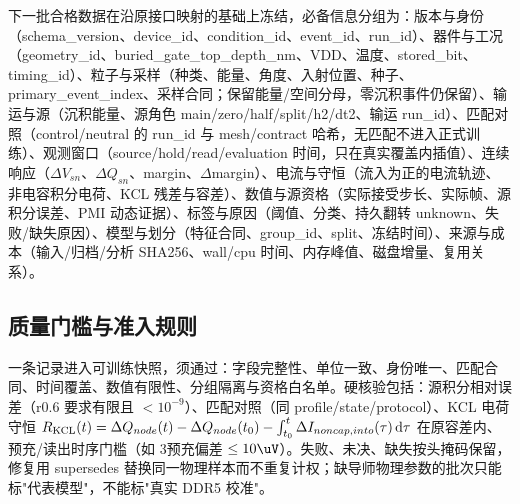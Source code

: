下一批合格数据在沿原接口映射的基础上冻结，必备信息分组为：版本与身份（schema\_version、device\_id、condition\_id、event\_id、run\_id）、器件与工况（geometry\_id、buried\_gate\_top\_depth\_nm、VDD、温度、stored\_bit、timing\_id）、粒子与采样（种类、能量、角度、入射位置、种子、primary\_event\_index、采样合同；保留能量/空间分母，零沉积事件仍保留）、输运与源（沉积能量、源角色 main/zero/half/split/h2/dt2、输运 run\_id）、匹配对照（control/neutral 的 run\_id 与 mesh/contract 哈希，无匹配不进入正式训练）、观测窗口（source/hold/read/evaluation 时间，只在真实覆盖内插值）、连续响应（$\Delta V_{sn}$、$\Delta Q_{sn}$、margin、$\Delta$margin）、电流与守恒（流入为正的电流轨迹、非电容积分电荷、KCL 残差与容差）、数值与源资格（实际接受步长、实际帧、源积分误差、PMI 动态证据）、标签与原因（阈值、分类、持久翻转 unknown、失败/缺失原因）、模型与划分（特征合同、group\_id、split、冻结时间）、来源与成本（输入/归档/分析 SHA256、wall/cpu 时间、内存峰值、磁盘增量、复用关系）。

\subsection{质量门槛与准入规则}

一条记录进入可训练快照，须通过：字段完整性、单位一致、身份唯一、匹配合同、时间覆盖、数值有限性、分组隔离与资格白名单。硬核验包括：源积分相对误差（r0.6 要求有限且 $<10^{-9}$）、匹配对照（同 profile/state/protocol）、KCL 电荷守恒 $R_{\rm KCL}(t)=\Delta Q_{node}(t)-\Delta Q_{node}(t_0)-\int_{t_0}^{t}\Delta I_{noncap,into}(\tau)\,\mathrm d\tau$ 在原容差内、预充/读出时序门槛（如 3\ns 预充偏差 $\leq 10\uV$）。失败、未决、缺失按头掩码保留，修复用 supersedes 替换同一物理样本而不重复计权；缺导师物理参数的批次只能标"代表模型"，不能标"真实 DDR5 校准"。
